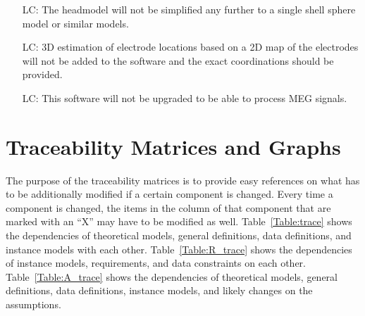 \documentclass[12pt]{article}
\newcounter{lcnum} %
\begin{document}
\noindent \begin{itemize}

\item[LC\refstepcounter{lcnum}\thelcnum\label{LC_meaningfulLabel}:] The headmodel will not be simplified any further to a single shell sphere model or similar models.

\item[LC\refstepcounter{lcnum}\thelcnum\label{LC_meaningfulLabel}:] 3D estimation of electrode locations based on a 2D map of the electrodes will not be added to the software and the exact coordinations should be provided.

\item[LC\refstepcounter{lcnum}\thelcnum\label{LC_meaningfulLabel}:] This software will not be upgraded to be able to process MEG signals.


\end{itemize}

\section{Traceability Matrices and Graphs}

The purpose of the traceability matrices is to provide easy references on what
has to be additionally modified if a certain component is changed.  Every time a
component is changed, the items in the column of that component that are marked
with an ``X'' may have to be modified as well.  Table~\ref{Table:trace} shows the
dependencies of theoretical models, general definitions, data definitions, and
instance models with each other. Table~\ref{Table:R_trace} shows the
dependencies of instance models, requirements, and data constraints on each
other. Table~\ref{Table:A_trace} shows the dependencies of theoretical models,
general definitions, data definitions, instance models, and likely changes on
the assumptions.


\end{document}

